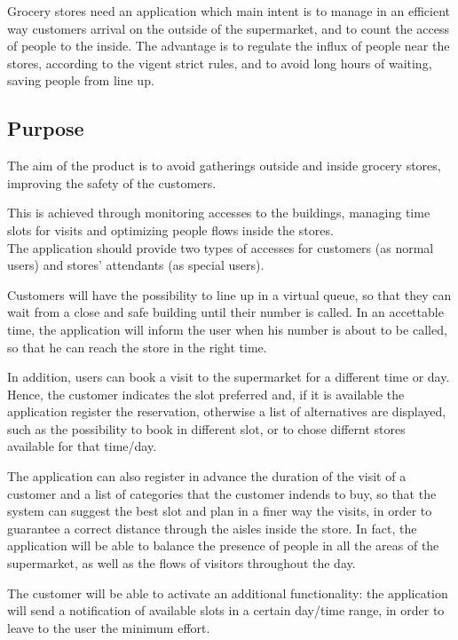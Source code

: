 \documentclass[12pt]{article}
\begin{document}
Grocery stores need an application which main intent is to manage in an efficient way customers arrival on the outside of the supermarket, and to count the access of people to the inside. The advantage is to regulate the influx of people near the stores, according to the vigent strict rules, and to avoid long hours of waiting, saving people from line up.

\subsection{Purpose}
The aim of the product is to avoid gatherings outside and inside grocery stores,  improving the safety of the customers.

This is achieved through monitoring accesses to the buildings, managing time slots for visits and optimizing people flows inside the stores.\\

The application should provide two types of accesses for customers (as normal users) and stores' attendants (as special users).

Customers will have the possibility to line up in a virtual queue, so that they can wait from a close and safe building until their number is called. In an accettable time, the application will inform the user when his number is about to be called, so that he can reach the store in the right time.

In addition, users can book a visit to the supermarket for a different time or day. Hence, the customer indicates the slot preferred and, if it is available the application register the reservation, otherwise a list of alternatives are displayed, such as the possibility to book in different slot, or to chose differnt stores available for that time/day.

The application can also register in advance the duration of the visit of a customer and a list of categories that the customer indends to buy, so that the system can suggest the best slot and plan in a finer way the visits, in order to guarantee a correct distance through the aisles inside the store. In fact, the application will be able to balance the presence of people in all the areas of the supermarket, as well as the flows of visitors throughout the day.

The customer will be able to activate an additional functionality: the application will send a notification of available slots in a certain day/time range, in order to leave to the user the minimum effort.
\end{document}
